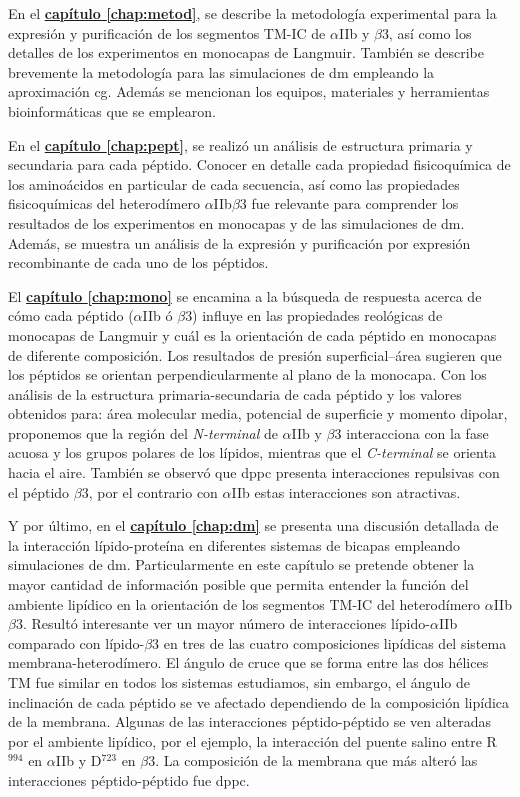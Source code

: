 En el \hyperref[chap:metod]{\textbf{capítulo \ref*{chap:metod}}}, se describe la metodología experimental para la expresión y purificación de los segmentos TM-IC de $\alpha$IIb y $\beta$3, así como los detalles de los experimentos en monocapas de Langmuir. También se describe brevemente la metodología para las simulaciones de \ac{dm} empleando la aproximación \ac{cg}. Además se mencionan los equipos, materiales y herramientas bioinformáticas que se emplearon.

En el \hyperref[chap:pept]{\textbf{capítulo \ref*{chap:pept}}}, se realizó un análisis de estructura primaria y secundaria para cada péptido. Conocer en detalle cada propiedad fisicoquímica de los aminoácidos en particular de cada secuencia, así como las propiedades fisicoquímicas del heterodímero $\alpha$IIb$\beta$3 fue relevante para comprender los resultados de los experimentos en monocapas y de las simulaciones de \ac{dm}. Además, se muestra un análisis de la expresión y purificación por expresión recombinante de cada uno de los péptidos.

El \hyperref[chap:mono]{\textbf{capítulo \ref*{chap:mono}}} se encamina a la búsqueda de respuesta acerca de cómo cada péptido ($\alpha$IIb ó $\beta$3) influye en las propiedades reológicas de monocapas de Langmuir y cuál es la orientación de cada péptido en monocapas de diferente composición. Los resultados de presión superficial--área sugieren que los péptidos se orientan perpendicularmente al plano de la monocapa. Con los análisis de la estructura primaria-secundaria de cada péptido y los valores obtenidos para: área molecular media, potencial de superficie y momento dipolar, proponemos que la región del \textit{N-terminal} de $\alpha$IIb y $\beta$3 interacciona con la fase acuosa y los grupos polares de los lípidos, mientras que el \textit{C-terminal} se orienta hacia el aire. También se observó que \ac{dppc} presenta interacciones repulsivas con el péptido $\beta$3, por el contrario con $\alpha$IIb estas interacciones son atractivas.

Y por último, en el \hyperref[chap:dm]{\textbf{capítulo \ref*{chap:dm}}} se presenta una discusión detallada de la interacción lípido-proteína en diferentes sistemas de bicapas empleando simulaciones de \ac{dm}. Particularmente en este capítulo se pretende obtener la mayor cantidad de información posible que permita entender la función del ambiente lipídico en la orientación de los segmentos TM-IC del heterodímero $\alpha$IIb$\beta$3. Resultó interesante ver un mayor número de interacciones lípido-$\alpha$IIb comparado con lípido-$\beta$3 en tres de las cuatro composiciones lipídicas del sistema membrana-heterodímero. El ángulo de cruce que se forma entre las dos hélices TM fue similar en todos los sistemas estudiamos, sin embargo, el ángulo de inclinación de cada péptido se ve afectado dependiendo de la composición lipídica de la membrana. Algunas de las interacciones péptido-péptido se ven alteradas por el ambiente lipídico, por el ejemplo, la interacción del puente salino entre R$^{994}$ en $\alpha$IIb y  D$^{723}$ en $\beta$3. La composición de la membrana que más alteró las interacciones péptido-péptido fue \ac{dppc}.
